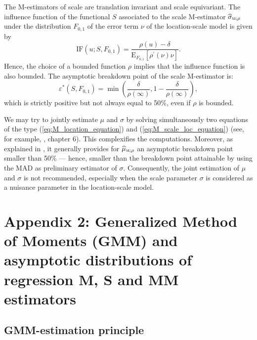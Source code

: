 The M-estimators of scale are translation invariant and scale equivariant. The
influence function of the functional $S$ associated to the scale M-estimator
$\sthat{\sigma}_{\stsc{M};\rho}$ under the distribution $F_{0,1}$ of the
error term $\nu$ of the location-scale model is given by
\[
\mathrm{IF}\left(  u;S,F_{0,1}\right)  =\frac{\rho\left(  u\right)  -\delta
}{\mathrm{E}_{F_{0,1}}\left[  \rho^{\prime}\left(  \nu\right)  \nu\right]  }.
\]
Hence, the choice of a bounded function $\rho$ implies that the influence
function is also bounded. The asymptotic breakdown point of the scale
M-estimator is:
\[
\varepsilon^*\left(  S,F_{0,1}\right)  =\min\left(  \frac{\delta}%
{\rho\left(  \infty\right)  },1-\frac{\delta}{\rho\left(  \infty\right)
}\right)  ,
\]
which is strictly positive but not always equal to 50\%, even if $\rho$ is bounded.

\begin{stremark}
We may try to jointly estimate $\mu$ and $\sigma$ by solving simultaneously
two equations of the type (\ref{eq:M_location_equation}) and
(\ref{eq:M_scale_loc_equation}) (see, for example, \citealp{Huber:2009}, chapter 6). This complexifies the computations. Moreover, as
explained in \cite{maronna:etal:2006}, it generally provides for
$\sthat{\mu}_{\stsc{M};\rho}$ an asymptotic breakdown point smaller than
50\% --- hence, smaller than the breakdown point attainable by using the MAD
as preliminary estimator of $\sigma$. Consequently, the joint estimation of
$\mu$ and $\sigma$ is not recommended, especially when the scale parameter
$\sigma$ is considered as a nuisance parameter in the location-scale model.
\end{stremark}

\section{Appendix 2: Generalized Method of Moments (GMM) and asymptotic distributions of regression M, S and MM estimators}
\label{sec:robreg:appendix2}

\subsection{GMM-estimation principle}


